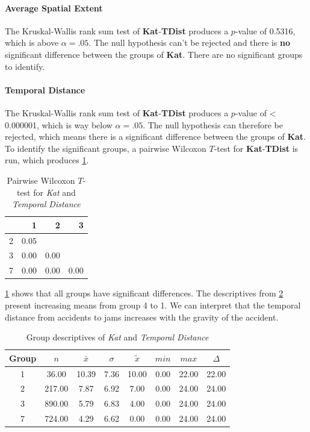 \paragraph{Average Spatial Extent}
The Kruskal-Wallis rank sum test of \textbf{Kat}-\textbf{TDist} produces a $p$-value of 0.5316, which is above $\alpha=.05$. The null hypothesis can't be rejected and there is \textbf{no} significant difference between the groups of \textbf{Kat}. There are no significant groups to identify.

\paragraph{Temporal Distance}
The Kruskal-Wallis rank sum test of \textbf{Kat}-\textbf{TDist} produces a $p$-value of < 0.000001, which is way below $\alpha=.05$. The null hypothesis can therefore be rejected, which means there is a significant difference between the groups of \textbf{Kat}. To identify the significant groups, a pairwise Wilcoxon $T$-test for \textbf{Kat}-\textbf{TDist} is run, which produces \cref{tbl:wilcoxon_baysis_matched_Kat_TDist}. 
\begin{table}[ht]
	\small
	\centering
	\begin{tabular}{rrrr}
		\toprule
		& 1 & 2 & 3 \\ 
		\midrule
		2 & 0.05 &  &  \\ 
		3 & 0.00 & 0.00 &  \\ 
		7 & 0.00 & 0.00 & 0.00 \\ 
		\bottomrule
	\end{tabular}
	\caption{Pairwise Wilcoxon $T$-test for \textit{Kat} and \textit{Temporal Distance}}
	\label{tbl:wilcoxon_baysis_matched_Kat_TDist}
\end{table}
\cref{tbl:wilcoxon_baysis_matched_Kat_TDist} shows that all groups have significant differences. The descriptives from \cref{tbl:descriptives_baysis_matched_Kat_TDist} present increasing means from group 4 to 1. We can interpret that the temporal distance from accidents to jams increases with the gravity of the accident.
\begin{table}[ht]
	\small
	\centering
	\begin{tabular}{c|c|c|c|c|c|c|c}
	  	\toprule
		Group & $n$ & $\bar{x}$ & $\sigma$ & $\tilde{x}$ & $min$ & $max$ & $\Delta$ \\ 
	  	\midrule
		1 & 36.00 & 10.39 & 7.36 & 10.00 & 0.00 & 22.00 & 22.00 \\ 
	  	2 & 217.00 & 7.87 & 6.92 & 7.00 & 0.00 & 24.00 & 24.00 \\ 
	  	3 & 890.00 & 5.79 & 6.83 & 4.00 & 0.00 & 24.00 & 24.00 \\ 
	  	7 & 724.00 & 4.29 & 6.62 & 0.00 & 0.00 & 24.00 & 24.00 \\ 
	   	\bottomrule
	\end{tabular}
	\caption{Group descriptives of \textit{Kat} and \textit{Temporal Distance}}
	\label{tbl:descriptives_baysis_matched_Kat_TDist}
\end{table}

